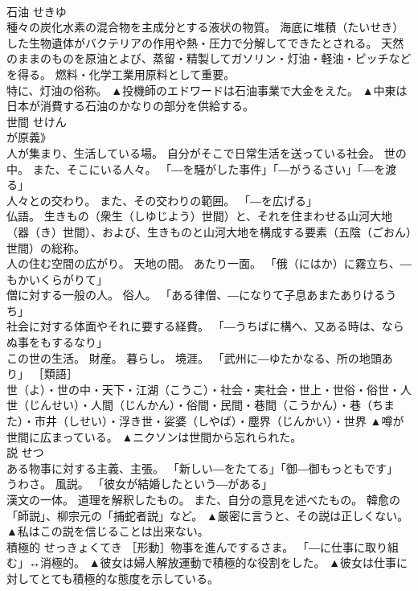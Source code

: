 \documentclass[8pt]{extreport}
\begin{document}
\begin{CJK}{UTF8}{min}
\\	石油	せきゆ	
\\	種々の炭化水素の混合物を主成分とする液状の物質。 海底に堆積（たいせき）した生物遺体がバクテリアの作用や熱・圧力で分解してできたとされる。 天然のままのものを原油とよび、蒸留・精製してガソリン・灯油・軽油・ピッチなどを得る。 燃料・化学工業用原料として重要。 
\\	特に、灯油の俗称。	▲投機師のエドワードは石油事業で大金をえた。 ▲中東は日本が消費する石油のかなりの部分を供給する。
\\	世間	せけん	
\\	が原義》 
\\	人が集まり、生活している場。 自分がそこで日常生活を送っている社会。 世の中。 また、そこにいる人々。 「―を騒がした事件」「―がうるさい」「―を渡る」 
\\	人々との交わり。 また、その交わりの範囲。 「―を広げる」 
\\	仏語。 生きもの（衆生（しゆじよう）世間）と、それを住まわせる山河大地（器（き）世間）、および、生きものと山河大地を構成する要素（五陰（ごおん）世間）の総称。 
\\	人の住む空間の広がり。 天地の間。 あたり一面。 「俄（にはか）に霧立ち、―もかいくらがりて」 
\\	僧に対する一般の人。 俗人。 「ある律僧、―になりて子息あまたありけるうち」 
\\	社会に対する体面やそれに要する経費。 「―うちばに構へ、又ある時は、ならぬ事をもするなり」 
\\	この世の生活。 財産。 暮らし。 境涯。 「武州に―ゆたかなる、所の地頭あり」 ［類語］
\\	世（よ）・世の中・天下・江湖（こうこ）・社会・実社会・世上・世俗・俗世・人世（じんせい）・人間（じんかん）・俗間・民間・巷間（こうかん）・巷（ちまた）・市井（しせい）・浮き世・娑婆（しやば）・塵界（じんかい）・世界	▲噂が世間に広まっている。 ▲ニクソンは世間から忘れられた。
\\	説	せつ	
\\	ある物事に対する主義、主張。 「新しい―をたてる」「御―御もっともです」 
\\	うわさ。 風説。 「彼女が結婚したという―がある」 
\\	漢文の一体。 道理を解釈したもの。 また、自分の意見を述べたもの。 韓愈の「師説」、柳宗元の「捕蛇者説」など。	▲厳密に言うと、その説は正しくない。 ▲私はこの説を信じることは出来ない。
\\	積極的	せっきょくてき	［形動］物事を進んでするさま。 「―に仕事に取り組む」↔消極的。	▲彼女は婦人解放運動で積極的な役割をした。 ▲彼女は仕事に対してとても積極的な態度を示している。

\end{CJK}
\end{document}
